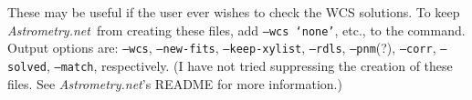 \documentclass{article}
\newcommand{\An}{\textit{Astrometry.net}}
\begin{document}
\noindent These may be useful if the user ever wishes to check the WCS
solutions. To keep \An~from creating these files, add \texttt{--wcs `none'},
etc., to the command. Output options are:
\texttt{--wcs}, \texttt{--new-fits}, \texttt{--keep-xylist},
\texttt{--rdls}, \texttt{--pnm}(?), \texttt{--corr},
\texttt{--solved}, \texttt{--match}, respectively. (I have not tried 
suppressing the creation of these files. See \An's README for more 
information.)
\end{document}
